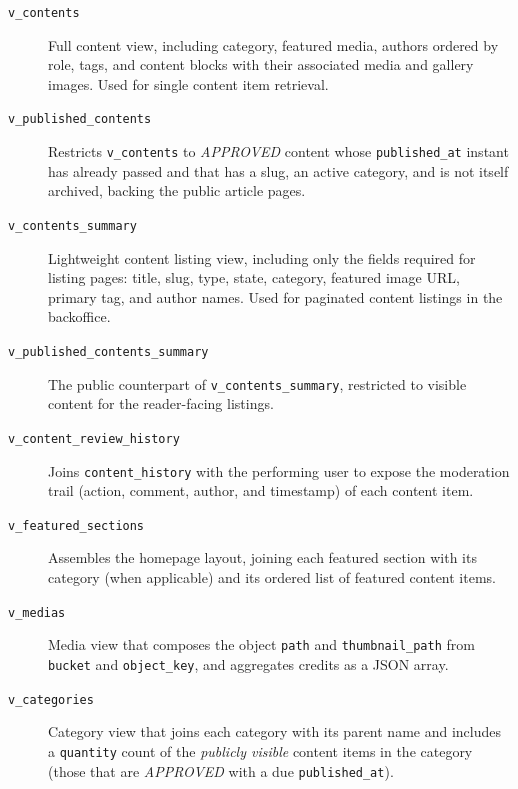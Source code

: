 \begin{description}
      \item[\texttt{v\_contents}] Full content view, including category, featured media,
            authors ordered by role, tags, and content blocks with their associated media
            and gallery images. Used for single content item retrieval.

      \item[\texttt{v\_published\_contents}] Restricts \texttt{v\_contents} to
            \textit{APPROVED} content whose \texttt{published\_at} instant has already
            passed and that has a slug, an active category, and is not itself archived,
            backing the public article pages.

      \item[\texttt{v\_contents\_summary}] Lightweight content listing view, including
            only the fields required for listing pages: title, slug, type, state,
            category, featured image URL, primary tag, and author names. Used for
            paginated content listings in the backoffice.

      \item[\texttt{v\_published\_contents\_summary}] The public counterpart of
            \texttt{v\_contents\_summary}, restricted to visible content for the reader-facing
            listings.

      \item[\texttt{v\_content\_review\_history}] Joins \texttt{content\_history} with the
            performing user to expose the moderation trail (action, comment, author, and
            timestamp) of each content item.

      \item[\texttt{v\_featured\_sections}] Assembles the homepage layout, joining each
            featured section with its category (when applicable) and its ordered list of
            featured content items.

      \item[\texttt{v\_medias}] Media view that composes the object \texttt{path} and
            \texttt{thumbnail\_path} from \texttt{bucket} and \texttt{object\_key}, and
            aggregates credits as a JSON array.

      \item[\texttt{v\_categories}] Category view that joins each category with its
            parent name and includes a \texttt{quantity} count of the \emph{publicly
                  visible} content items in the category (those that are \textit{APPROVED} with
            a due \texttt{published\_at}).


\end{description}
